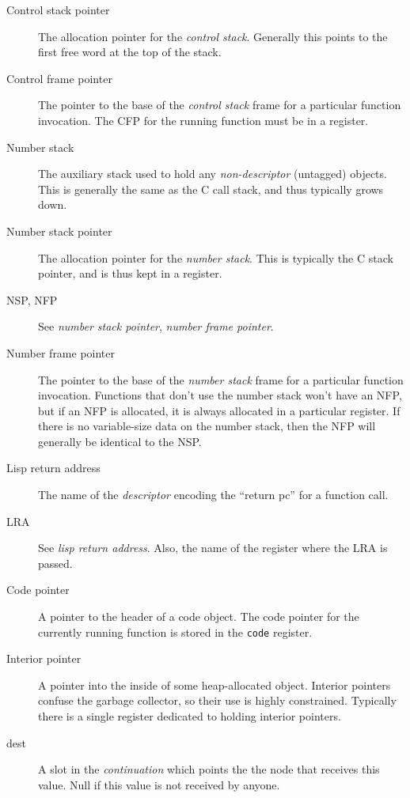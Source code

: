 \begin{description}
\item[Control stack pointer] The allocation pointer for the {\it control
stack}.  Generally this points to the first free word at the top of the stack.

\item[Control frame pointer] The pointer to the base of the {\it control stack}
frame for a particular function invocation.  The CFP for the running function
must be in a register.

\item[Number stack] The auxiliary stack used to hold any {\it non-descriptor}
(untagged) objects.  This is generally the same as the C call stack, and thus
typically grows down.

\item[Number stack pointer] The allocation pointer for the {\it number stack}.
This is typically the C stack pointer, and is thus kept in a register.

\item[NSP, NFP] See {\it number stack pointer}, {\it number frame pointer}.

\item[Number frame pointer] The pointer to the base of the {\it number stack}
frame for a particular function invocation.  Functions that don't use the
number stack won't have an NFP, but if an NFP is allocated, it is always
allocated in a particular register.  If there is no variable-size data on the
number stack, then the NFP will generally be identical to the NSP.

\item[Lisp return address] The name of the {\it descriptor} encoding the
``return pc'' for a function call.

\item[LRA] See {\it lisp return address}.  Also, the name of the register where
the LRA is passed.


\item[Code pointer] A pointer to the header of a code object.  The code pointer
for the currently running function is stored in the {\tt code} register.

\item[Interior pointer] A pointer into the inside of some heap-allocated
object.  Interior pointers confuse the garbage collector, so their use is
highly constrained.  Typically there is a single register dedicated to holding
interior pointers.

\item[dest]
A slot in the {\it continuation} which points the the node that receives this
value.  Null if this value is not received by anyone.


\end{description}
